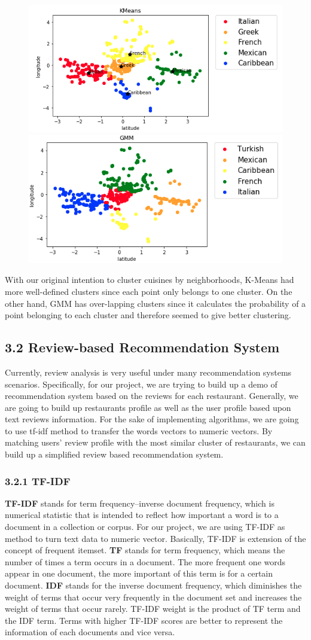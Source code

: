 \documentclass{neu_handout}
\begin{document}
\begin{figure}[h]
\centering
{
\includegraphics[width=0.4\linewidth]{kmeans}
}
{
\includegraphics[width=0.4\linewidth]{gmm}
}
\end{figure}

With our original intention to cluster cuisines by neighborhoods, K-Means had more well-defined clusters since each point only belongs to one cluster. On the other hand, GMM has over-lapping clusters since it calculates the probability of a point belonging to each cluster and therefore seemed to give better clustering.

\subsection*{3.2 Review-based Recommendation System}
Currently, review analysis is very useful under many recommendation systems scenarios. Specifically, for our project, we are trying to build up a demo of recommendation system based on the reviews for each restaurant. Generally, we are going to build up restaurants profile as well as the user profile based upon text reviews information. For the sake of implementing algorithms, we are going to use tf-idf method to transfer the words vectors to numeric vectors. By matching users’ review profile with the most similar cluster of restaurants, we can build up a simplified review based recommendation system.

\subsubsection*{3.2.1 TF-IDF}
\textbf{TF-IDF} stands for term frequency–inverse document frequency, which is numerical statistic that is intended to reflect how important a word is to a document in a collection or corpus. For our project, we are using TF-IDF as method to turn text data to numeric vector. Basically, TF-IDF is extension of the concept of frequent itemset. \textbf{TF} stands for term frequency, which means the number of times a term occurs in a document. The more frequent one words appear in one document, the more important of this term is for a certain document. \textbf{IDF} stands for the inverse document frequency, which diminishes the weight of terms that occur very frequently in the document set and increases the weight of terms that occur rarely. TF-IDF weight is the product of TF term and the IDF term. Terms with higher TF-IDF scores are better to represent the information of each documents and vice versa.
\end{document}
